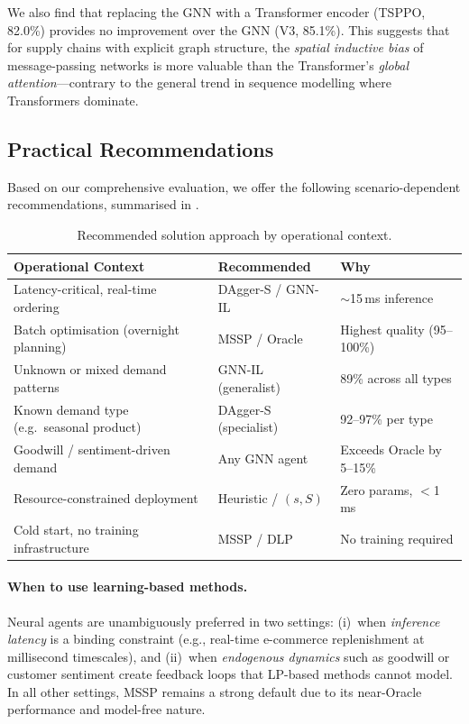 We also find that replacing the GNN with a Transformer encoder
(TSPPO, 82.0\%) provides no improvement over the GNN (V3, 85.1\%).
This suggests that for supply chains with explicit graph structure, the
\emph{spatial inductive bias} of message-passing networks is more
valuable than the Transformer's \emph{global attention}---contrary to
the general trend in sequence modelling where Transformers dominate.

\subsection{Practical Recommendations}\label{sec:recommend}

Based on our comprehensive evaluation, we offer the following
scenario-dependent recommendations, summarised in .

\begin{table}[htbp]
\centering
\caption{Recommended solution approach by operational context.}
\label{tab:recommendations}
\small
\begin{tabular}{p{5.5cm}ll}
\toprule
\textbf{Operational Context} & \textbf{Recommended} & \textbf{Why} \\
\midrule
Latency-critical, real-time ordering
  & DAgger-S / GNN-IL
  & $\sim$15\,ms inference \\
\addlinespace
Batch optimisation (overnight planning)
  & MSSP / Oracle
  & Highest quality (95--100\%) \\
\addlinespace
Unknown or mixed demand patterns
  & GNN-IL (generalist)
  & 89\% across all types \\
\addlinespace
Known demand type (e.g.\ seasonal product)
  & DAgger-S (specialist)
  & 92--97\% per type \\
\addlinespace
Goodwill / sentiment-driven demand
  & Any GNN agent
  & Exceeds Oracle by 5--15\% \\
\addlinespace
Resource-constrained deployment
  & Heuristic / $(s,S)$
  & Zero params, $<$1\,ms \\
\addlinespace
Cold start, no training infrastructure
  & MSSP / DLP
  & No training required \\
\bottomrule
\end{tabular}
\end{table}

\paragraph{When to use learning-based methods.}
Neural agents are unambiguously preferred in two settings:
(i)~when \emph{inference latency} is a binding constraint (e.g., real-time
e-commerce replenishment at millisecond timescales), and
(ii)~when \emph{endogenous dynamics} such as goodwill or customer
sentiment create feedback loops that LP-based methods cannot model.
In all other settings, MSSP remains a strong default due to its
near-Oracle performance and model-free nature.

